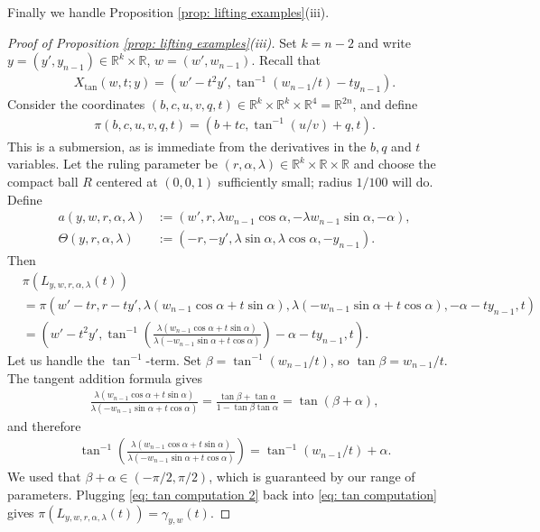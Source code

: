 \documentclass[reqno,11pt]{amsart}
\numberwithin{equation}{section}
\numberwithin{figure}{section}
\def\R{\mathbb{R}}
\theoremstyle{plain}
\theoremstyle{definition}
\begin{document}
    Finally we handle Proposition \ref{prop: lifting examples}(iii). 
    \begin{proof}[Proof of Proposition \ref{prop: lifting examples}(iii)]
        Set $k = n-2$ and write $y = (y', y_{n-1}) \in \R^k \times \R$, $w = (w', w_{n-1})$. Recall that 
        \begin{align}
            X_{\tan}(w,t;y) = (w' - t^2y', \tan^{-1}(w_{n-1}/t)-ty_{n-1}).
        \end{align}
        Consider the coordinates $(b,c,u,v,q,t) \in \R^k \times \R^k \times \R^4 = \R^{2n}$,
        and define
        \begin{align}
            \pi(b, c,u,v,q,t) = (b+tc, \tan^{-1} (u/v) + q, t).
        \end{align}
        This is a submersion, as is immediate from the derivatives in the $b,q$ and $t$ variables.
        Let the ruling parameter be $(r,\alpha, \lambda) \in \R^k \times \R \times \R$ and choose the compact ball $R$ centered at $(0,0,1)$ sufficiently small; radius $1/100$ will do. Define
        \begin{align}
            a(y,w,r,\alpha,\lambda) &:= (w',r,\lambda w_{n-1} \cos\alpha, -\lambda w_{n-1} \sin \alpha, -\alpha), \\
            \Theta(y,r,\alpha,\lambda) &:= (-r,-y', \lambda \sin \alpha, \lambda \cos \alpha, - y_{n-1}).
        \end{align}
        Then
        \begin{align}
            &\pi(L_{y,w,r,\alpha,\lambda}(t)) \\&= \pi(w'-tr,r-ty',\lambda(w_{n-1} \cos\alpha+t\sin\alpha),\lambda(-w_{n-1}\sin \alpha + t\cos \alpha),-\alpha-ty_{n-1},t) \\
            &=(w'-t^2y',\tan^{-1}(\frac{\lambda(w_{n-1}\cos \alpha + t \sin \alpha)}{\lambda(- w_{n-1}\sin \alpha +t\cos \alpha )})-\alpha - ty_{n-1},t). \label{eq: tan computation}
        \end{align}
        Let us handle the $\tan^{-1}$-term. Set $\beta = \tan^{-1}(w_{n-1}/t)$, so $\tan \beta = w_{n-1}/t$. The tangent addition formula gives 
        \begin{align}
            \frac{\lambda(w_{n-1}\cos \alpha + t \sin \alpha)}{\lambda(- w_{n-1}\sin \alpha +t\cos \alpha )} = \frac{\tan \beta + \tan \alpha}{1 - \tan \beta \tan \alpha} 
            = \tan(\beta + \alpha),
        \end{align}
        and therefore 
        \begin{align}
            \tan^{-1}(\frac{\lambda(w_{n-1}\cos \alpha + t \sin \alpha)}{\lambda(- w_{n-1}\sin \alpha +t\cos \alpha )})
            = \tan^{-1}(w_{n-1}/t) + \alpha. \label{eq: tan computation 2}
        \end{align}
        We used that $\beta + \alpha \in (-\pi/2, \pi/2)$, which is guaranteed by our range of parameters. Plugging \eqref{eq: tan computation 2} back into \eqref{eq: tan computation} gives $\pi(L_{y,w,r,\alpha,\lambda}(t)) = \gamma_{y,w}(t)$. 


\end{proof}
\end{document}
